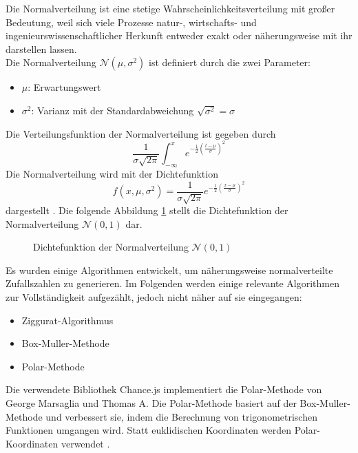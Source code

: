 Die Normalverteilung ist eine stetige Wahrscheinlichkeitsverteilung mit großer Bedeutung, weil sich viele Prozesse natur-, wirtschafts- und ingenieurswissenschaftlicher Herkunft entweder exakt oder näherungsweise mit ihr darstellen lassen.\\ 
Die Normalverteilung $\mathcal{N}(\mu,\sigma ^2)$ ist definiert durch die zwei Parameter: 
\begin{itemize}
    \item $\mu$: Erwartungswert
    \item $\sigma^2$: Varianz mit der Standardabweichung $\sqrt{\sigma^2}=\sigma$
\end{itemize}
Die Verteilungsfunktion der Normalverteilung ist gegeben durch
$$\frac{1}{\sigma\sqrt{2\pi}} \int_{-\infty}^x e^{-\frac{1}{2} \left(\frac{t-\mu}{\sigma}\right)^2}$$
Die Normalverteilung wird mit der Dichtefunktion
$$f(x,\mu,\sigma^2)=\frac{1}{\sigma\sqrt{2\pi}}e^{-\frac{1}{2}(\frac{x-\mu}{\sigma})^2}$$
dargestellt \cite{Inversionsmethode}. Die folgende Abbildung \ref{fig:normalverteilung} stellt die Dichtefunktion der Normalverteilung $\mathcal{N}(0,1)$ dar.

\begin{figure}[H]
    \centering
    \caption{Dichtefunktion der Normalverteilung $\mathcal{N}(0,1)$}
    \label{fig:normalverteilung}
\end{figure}

Es wurden einige Algorithmen entwickelt, um näherungsweise normalverteilte Zufallszahlen zu generieren. Im Folgenden werden einige relevante Algorithmen zur Vollständigkeit aufgezählt, jedoch nicht näher auf sie eingegangen:
\begin{itemize}
    \item Ziggurat-Algorithmus
    \item Box-Muller-Methode
    \item Polar-Methode
\end{itemize}

Die verwendete Bibliothek Chance.js implementiert die Polar-Methode von George Marsaglia und Thomas A. Die Polar-Methode basiert auf der Box-Muller-Methode und verbessert sie, indem die Berechnung von trigonometrischen Funktionen umgangen wird. Statt euklidischen Koordinaten werden Polar-Koordinaten verwendet \cite{polarmethode}.

